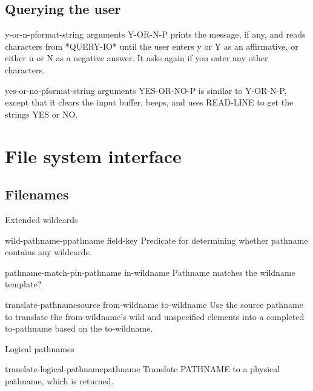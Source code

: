 \documentclass[10pt,english]{book}
\begin{document}
\section{Querying the user}
\label{sec:querying-user}

\begin{function}{y-or-n-p}{\op format-string \rest arguments}
  Y-OR-N-P prints the message, if any, and reads characters from
   *QUERY-IO* until the user enters y or Y as an affirmative, or either
   n or N as a negative answer. It asks again if you enter any other
   characters.
\end{function}

\begin{function}{yes-or-no-p}{\op format-string \rest arguments}
  YES-OR-NO-P is similar to Y-OR-N-P, except that it clears the
   input buffer, beeps, and uses READ-LINE to get the strings
   YES or NO.
\end{function}


\chapter{File system interface}
\label{cha:file-syst-interf}

\section{Filenames}
\label{sec:filenames}

Extended wildcards

\begin{function}{wild-pathname-p}{pathname \op field-key}
  Predicate for determining whether pathname contains any wildcards.
\end{function}

\begin{function}{pathname-match-p}{in-pathname in-wildname}
  Pathname matches the wildname template?
\end{function}

\begin{function}{translate-pathname}{source from-wildname to-wildname \key}
  Use the source pathname to translate the from-wildname's wild and
   unspecified elements into a completed to-pathname based on the to-wildname.
\end{function}

Logical pathnames

\begin{function}{translate-logical-pathname}{pathname \key}
  Translate PATHNAME to a physical pathname, which is returned.
\end{function}
\end{document}
